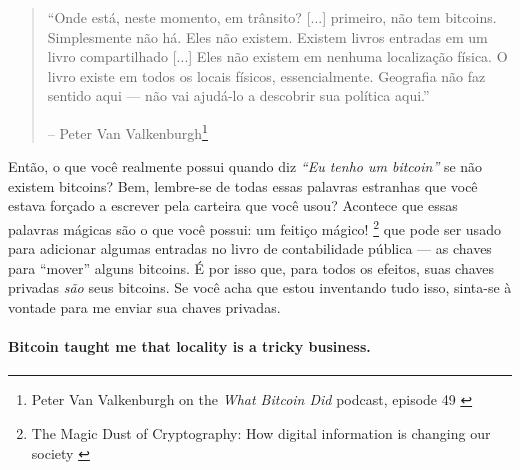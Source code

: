 \begin{quotation}\begin{samepage}
\enquote{Onde está, neste momento, em trânsito? [...] primeiro, não tem
bitcoins. Simplesmente não há. Eles não existem. Existem livros
entradas em um livro compartilhado [...] Eles não existem em nenhuma
localização física. O livro existe em todos os locais físicos,
essencialmente. Geografia não faz sentido aqui --- não vai
ajudá-lo a descobrir sua política aqui.}
\begin{flushright} -- Peter Van Valkenburgh\footnote{Peter Van Valkenburgh on the \textit{What Bitcoin Did} podcast, episode 49 \cite{wbd049}}
\end{flushright}\end{samepage}\end{quotation}

Então, o que você realmente possui quando diz \textit{\enquote{Eu tenho um bitcoin}} se
não existem bitcoins? Bem, lembre-se de todas essas palavras estranhas que você estava
forçado a escrever pela carteira que você usou? Acontece que essas palavras mágicas são
o que você possui: um feitiço mágico! \footnote{The Magic Dust of Cryptography: How digital
information is changing our society \cite{gigi:magic-spell}} que pode ser usado
para adicionar algumas entradas no livro de contabilidade pública --- as chaves para
 \enquote{mover} alguns bitcoins.
É por isso que, para todos os efeitos, suas chaves privadas \textit{são} seus 
bitcoins. Se você acha que estou inventando tudo isso, sinta-se à vontade para me enviar sua
chaves privadas.

\paragraph{Bitcoin taught me that locality is a tricky business.}

%
%
%
%
%
%
%
